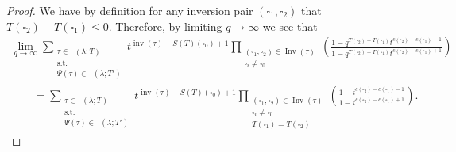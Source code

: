\documentclass[pdftex]{sigma}
\numberwithin{equation}{section}
\theoremstyle{definition}
\DeclareMathOperator{\PSYT}{\mathrm{PSYT}_{\geq 0}}
\DeclareMathOperator{\Inv}{\mathrm{Inv}}
\DeclareMathOperator{\inv}{inv}
\begin{document}
\begin{proof}
We have by definition for any inversion pair $(\square_1,\square_2)$ that $T(\square_2)- T(\square_1) \leq 0$. Therefore, by limiting $q \rightarrow \infty$ we see that
\begin{gather*}
\lim_{q\rightarrow \infty} \sum_{\substack{\tau \in \PSYT(\lambda;T) \\ \text{s.t.}\\ \Psi(\tau) \in \PSYT(\lambda;T')}} t^{\inv(\tau) -S(T)(\square_0)+1} \prod_{\substack{(\square_1,\square_2) \in \Inv(\tau)\\ \square_i \neq \square_0}} \left( \frac{1 - q^{T(\square_2)-T(\square_1)}t^{c(\square_2)-c(\square_1)-1}}{1 - q^{T(\square_2)-T(\square_1)}t^{c(\square_2)-c(\square_1)+1}} \right) \\
\qquad= \sum_{\substack{\tau \in \PSYT(\lambda;T) \\ \text{s.t.}\\ \Psi(\tau) \in \PSYT(\lambda;T')}} t^{\inv(\tau) -S(T)(\square_0)+1} \prod_{\substack{(\square_1,\square_2) \in \Inv(\tau)\\ \square_i \neq \square_0 \\ T(\square_1)=T(\square_2)}} \left( \frac{1 - t^{c(\square_2)-c(\square_1)-1}}{1 -t^{c(\square_2)-c(\square_1)+1}} \right).
\end{gather*}


\end{proof}
\end{document}
